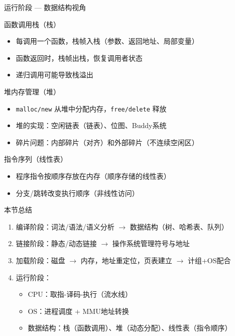 \documentclass[10pt, aspectratio=169]{beamer}
\begin{document}
\begin{frame}{运行阶段 --- 数据结构视角}
    \begin{block}{函数调用栈（栈）}
        \begin{itemize}
            \item 每调用一个函数，栈帧入栈（参数、返回地址、局部变量）
            \item 函数返回时，栈帧出栈，恢复调用者状态
            \item 递归调用可能导致栈溢出
        \end{itemize}
    \end{block}
    \begin{block}{堆内存管理（堆）}
        \begin{itemize}
            \item \texttt{malloc/new} 从堆中分配内存，\texttt{free/delete} 释放
            \item 堆的实现：空闲链表（链表）、位图、Buddy系统
            \item 碎片问题：内部碎片（对齐）和外部碎片（不连续空闲区）
        \end{itemize}
    \end{block}
    \begin{block}{指令序列（线性表）}
        \begin{itemize}
            \item 程序指令按顺序存放在内存（顺序存储的线性表）
            \item 分支/跳转改变执行顺序（非线性访问）
        \end{itemize}
    \end{block}
\end{frame}

\begin{frame}{本节总结}
    \begin{enumerate}
        \item 编译阶段：词法/语法/语义分析 $\to$ 数据结构（树、哈希表、队列）
        \item 链接阶段：静态/动态链接 $\to$ 操作系统管理符号与地址
        \item 加载阶段：磁盘 $\to$ 内存，地址重定位，页表建立 $\to$ 计组+OS配合
        \item 运行阶段：
            \begin{itemize}
                \item CPU：取指-译码-执行（流水线）
                \item OS：进程调度 + MMU地址转换
                \item 数据结构：栈（函数调用）、堆（动态分配）、线性表（指令顺序）
            \end{itemize}
    \end{enumerate}
\end{frame}
\end{document}
